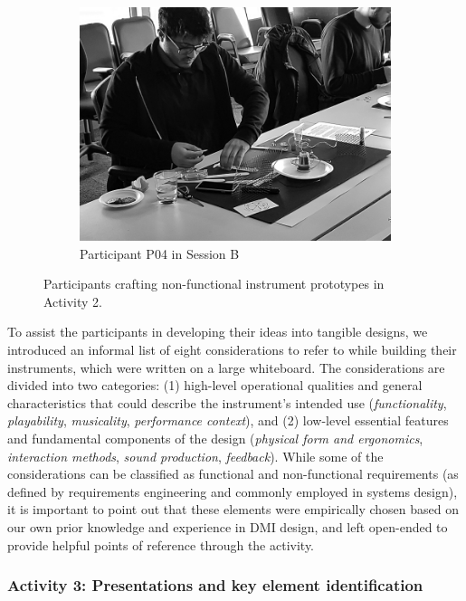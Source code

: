 \documentclass[letterpaper, 12pt]{article}
\begin{document}
\begin{figure}[t]
\begin{subfigure}[]{0.4\textwidth}
        \includegraphics[width=1\textwidth]{dfp_nfp_B_P4.jpg}
        \caption{Participant P04 in Session B}
        \label{fig:tapbox-cad}
    \end{subfigure}
    \caption{Participants crafting non-functional instrument prototypes in Activity 2.}
    \label{fig:instrument-building}
\end{figure}

To assist the participants in developing their ideas into tangible designs, we introduced an informal list of eight considerations to refer to while building their instruments, which were written on a large whiteboard. The considerations are divided into two categories: (1) high-level operational qualities and general characteristics that could describe the instrument's intended use (\emph{functionality}, \emph{playability}, \emph{musicality}, \emph{performance context}), and (2) low-level essential features and fundamental components of the design (\emph{physical form and ergonomics}, \emph{interaction methods}, \emph{sound production}, \emph{feedback}). While some of the considerations can be classified as functional and non-functional requirements (as defined by requirements engineering \citep{Glinz2007} and commonly employed in systems design), it is important to point out that these elements were empirically chosen based on our own prior knowledge and experience in DMI design, and left open-ended to provide helpful points of reference through the activity. 

\subsubsection{Activity 3: Presentations and key element identification}
\label{sec:activity-3-presentations}
\end{document}
